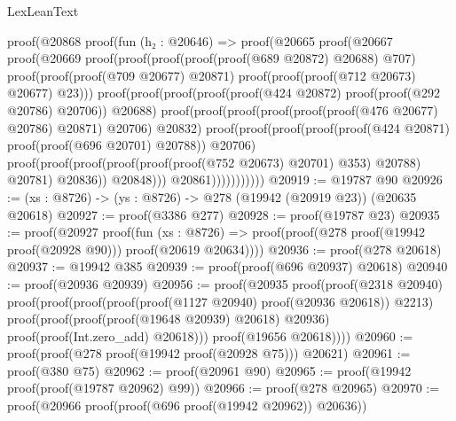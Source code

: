 \begin{lexlean}{LexLeanText}
\begin{coremodule}
          proof(@20868
              proof(fun (h₂ : @20646) =>
                proof(@20665
                    proof(@20667
                        proof(@20669
                            proof(proof(proof(proof(proof(@689 @20872) @20688) @707)
                                  proof(proof(proof(@709 @20677) @20871)
                                      proof(proof(proof(@712 @20673) @20677) @23)))
                                proof(proof(proof(proof(proof(@424 @20872)
                                          proof(proof(@292 @20786) @20706))
                                        @20688)
                                      proof(proof(proof(proof(proof(proof(@476 @20677) @20786)
                                                @20871)
                                              @20706)
                                            @20832)
                                          proof(proof(proof(proof(proof(@424 @20871)
                                                    proof(proof(@696 @20701) @20788))
                                                  @20706)
                                                proof(proof(proof(proof(proof(proof(@752 @20673)
                                                            @20701)
                                                          @353)
                                                        @20788)
                                                      @20781)
                                                    @20836))
                                              @20848)))
                                    @20861)))))))))))
@20919 := @19787 @90
@20926 := (xs : @8726) -> (ys : @8726) -> @278 (@19942 (@20919 @23)) (@20635 @20618)
@20927 := proof(@3386 @277)
@20928 := proof(@19787 @23)
@20935 := proof(@20927
      proof(fun (xs : @8726) =>
        proof(proof(@278 proof(@19942 proof(@20928 @90))) proof(@20619 @20634))))
@20936 := proof(@278 @20618)
@20937 := @19942 @385
@20939 := proof(proof(@696 @20937) @20618)
@20940 := proof(@20936 @20939)
@20956 := proof(@20935
      proof(proof(@2318 @20940)
          proof(proof(proof(proof(proof(@1127 @20940) proof(@20936 @20618)) @2213)
                proof(proof(proof(proof(@19648 @20939) @20618) @20936)
                    proof(proof(Int.zero_add) @20618)))
              proof(@19656 @20618))))
@20960 := proof(proof(@278 proof(@19942 proof(@20928 @75))) @20621)
@20961 := proof(@380 @75)
@20962 := proof(@20961 @90)
@20965 := proof(@19942 proof(proof(@19787 @20962) @99))
@20966 := proof(@278 @20965)
@20970 := proof(@20966 proof(proof(@696 proof(@19942 @20962)) @20636))

\end{coremodule}
\end{lexlean}
